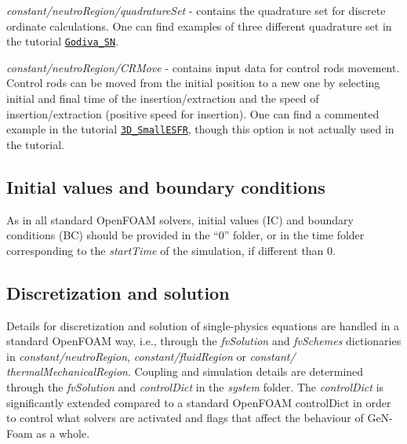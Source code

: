 \begin{DoxyItemize}
\item {\itshape constant/neutro\+Region/quadrature\+Set} -\/ contains the quadrature set for discrete ordinate calculations. One can find examples of three different quadrature set in the tutorial \href{https://gitlab.com/foam-for-nuclear/GeN-Foam/-/tree/master/Tutorials/Godiva_SN/constant/neutroRegion/}{\tt Godiva\+\_\+\+SN}.
\item {\itshape constant/neutro\+Region/\+C\+R\+Move} -\/ contains input data for control rods movement. Control rods can be moved from the initial position to a new one by selecting initial and final time of the insertion/extraction and the speed of insertion/extraction (positive speed for insertion). One can find a commented example in the tutorial \href{https://gitlab.com/foam-for-nuclear/GeN-Foam/-/tree/master/Tutorials/3D_SmallESFR/rootCase/constant/neutroRegion/CRmove}{\tt 3\+D\+\_\+\+Small\+E\+S\+FR}, though this option is not actually used in the tutorial.
\end{DoxyItemize}

\subsection*{Initial values and boundary conditions}

As in all standard Open\+F\+O\+AM solvers, initial values (IC) and boundary conditions (BC) should be provided in the “0” folder, or in the time folder corresponding to the {\itshape start\+Time} of the simulation, if different than 0.

\subsection*{Discretization and solution}

Details for discretization and solution of single-\/physics equations are handled in a standard Open\+F\+O\+AM way, i.\+e., through the {\itshape fv\+Solution} and {\itshape fv\+Schemes} dictionaries in {\itshape constant/neutro\+Region}, {\itshape constant/fluid\+Region} or {\itshape constant/ thermal\+Mechanical\+Region}. Coupling and simulation details are determined through the {\itshape fv\+Solution} and {\itshape control\+Dict} in the {\itshape system} folder. The {\itshape control\+Dict} is significantly extended compared to a standard Open\+F\+O\+AM control\+Dict in order to control what solvers are activated and flags that affect the behaviour of Ge\+N-\/\+Foam as a whole. 